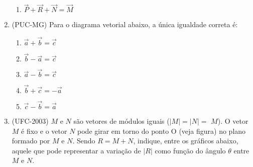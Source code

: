 \begin{enumerate}
\begin{enumerate}
\item {} 
\(\vec{P} + \vec{R} + \vec{N} = \vec{M}\)

\end{enumerate}

\clearpage
\item (PUC-MG) Para o diagrama vetorial abaixo, a única igualdade correta é:
\begin{quote}
\begin{center}\end{center}\end{quote}
\begin{enumerate}
\item {} 
\(\vec{a}+\vec{b}=\vec{c}\)

\item {} 
\(\vec{b}-\vec{a}=\vec{c}\)

\item {} 
\(\vec{a}-\vec{b}=\vec{c}\)

\item {} 
\(\vec{b}+\vec{c}=-\vec{a}\)

\item {} 
\(\vec{c}-\vec{b}=\vec{a}\)

\end{enumerate}

\item (UFC-2003) \(M\) e \(N\) são vetores de módulos iguais (\(|M|=|N|=\) \(M\)). O vetor \(M\) é fixo e o vetor \(N\) pode girar em torno do ponto O (veja figura) no plano formado por \(M\) e \(N\). Sendo \(R=M+N\), indique, entre os gráficos abaixo, aquele que pode representar a variação de \(|R|\) como função do ângulo \(\theta\) entre \(M\) e \(N\).

\begin{center}



\end{center}
\end{enumerate}
